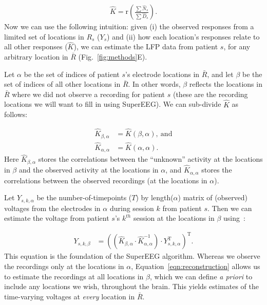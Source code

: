 \documentclass[11pt]{article}
\begin{document}
\begin{align}
 \hat{K} = \mathrm{r} \left (  \frac{\sum  \hat{N}_{s}}{\sum \hat{D}_{s}}\right ).\label{eqn:correlation_matrix}
\end{align}
Now we can use the following intuition: given (i) the observed
responses from a limited set of locations in $R_{s}$ ($Y_{s}$) and
(ii) how each location's responses relate to all other responses
($\hat{K}$), we can estimate the LFP data from patient
$s$, for any arbitrary location in $\bar{R}$
(Fig.~\ref{fig:methods}E).

Let $\alpha$ be the set of indices of patient $s$'s electrode locations in
$\bar{R}$, and let $\beta$ be the set of indices of all other
locations in $\bar{R}$. In other words, $\beta$ reflects the locations
in $\bar{R}$ where we did not observe a recording for patient $s$
(these are the recording locations we will want to fill in using SuperEEG).
We can sub-divide $\hat{K}$ as follows:

\begin{align}
\hat{K}_{\beta,\alpha} &= \hat{K}(\beta,\alpha),~\mathrm{and}\label{eqn:Kba}\\
\hat{K}_{\alpha,\alpha} &= \hat{K}(\alpha,\alpha)\label{eqn:Kaa}.
\end{align}
Here $\hat{K}_{\beta, \alpha}$ stores the correlations between the
``unknown'' activity at the locations in $\beta$ and the observed
activity at the locations in $\alpha$, and $\hat{K}_{\alpha, \alpha}$
stores the correlations between the observed recordings (at the
locations in $\alpha$). 

Let $Y_{s,k,\alpha}$ be the number-of-timepoints
($T$) by length($\alpha$) matrix of (observed) voltages from the electrodes in $\alpha$ during session $k$ from patient $s$. Then we can estimate the voltage from patient $s$'s $k^{th}$ session at the locations in $\beta$ using~\cite{Rasm06}:

\begin{align}
Y_{s,k,\beta} &= ((\hat{K}_{\beta,\alpha}\cdot\hat{K}_{\alpha,\alpha}^{-1})\cdot Y_{s,k,\alpha}^\mathrm{T})^\mathrm{T}.\label{eqn:reconstruction}
\end{align}
This equation is the foundation of the SuperEEG algorithm.  Whereas
we observe the recordings only at the locations in $\alpha$,
Equation~\ref{eqn:reconstruction} allows us to estimate the recordings
at all locations in $\beta$, which we can define \textit{a priori} to
include any locations we wish, throughout the brain.  This yields estimates of
the time-varying voltages at \textit{every} location in $\bar{R}$.
\end{document}
